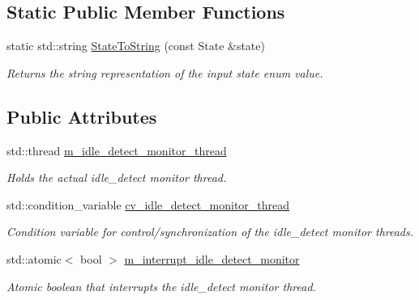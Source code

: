 \subsection*{Static Public Member Functions}
\begin{DoxyCompactItemize}
\item 
static std\+::string \mbox{\hyperlink{classEventDetect_1_1IdleDetectMonitor_a60029f382d471e20c530cf5f61d2f71c}{State\+To\+String}} (const State \&state)
\begin{DoxyCompactList}\small\item\em Returns the string representation of the input state enum value. \end{DoxyCompactList}\end{DoxyCompactItemize}
\subsection*{Public Attributes}
\begin{DoxyCompactItemize}
\item 
\mbox{\label{classEventDetect_1_1IdleDetectMonitor_a64c5c35a0464fd41d34f8186f73ec61f}} 
std\+::thread \mbox{\hyperlink{classEventDetect_1_1IdleDetectMonitor_a64c5c35a0464fd41d34f8186f73ec61f}{m\+\_\+idle\+\_\+detect\+\_\+monitor\+\_\+thread}}
\begin{DoxyCompactList}\small\item\em Holds the actual idle\+\_\+detect monitor thread. \end{DoxyCompactList}\item 
\mbox{\label{classEventDetect_1_1IdleDetectMonitor_ab87d238be94053688b977a25384f8c1f}} 
std\+::condition\+\_\+variable \mbox{\hyperlink{classEventDetect_1_1IdleDetectMonitor_ab87d238be94053688b977a25384f8c1f}{cv\+\_\+idle\+\_\+detect\+\_\+monitor\+\_\+thread}}
\begin{DoxyCompactList}\small\item\em Condition variable for control/synchronization of the idle\+\_\+detect monitor threads. \end{DoxyCompactList}\item 
\mbox{\label{classEventDetect_1_1IdleDetectMonitor_a1563d170414bbb849532ab972457c7cc}} 
std\+::atomic$<$ bool $>$ \mbox{\hyperlink{classEventDetect_1_1IdleDetectMonitor_a1563d170414bbb849532ab972457c7cc}{m\+\_\+interrupt\+\_\+idle\+\_\+detect\+\_\+monitor}}
\begin{DoxyCompactList}\small\item\em Atomic boolean that interrupts the idle\+\_\+detect monitor thread. \end{DoxyCompactList}\end{DoxyCompactItemize}
